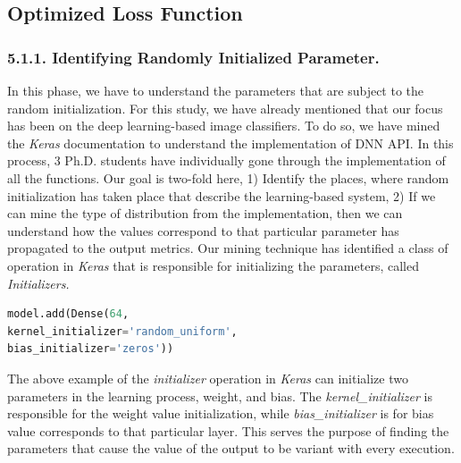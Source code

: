 \subsection{Optimized Loss Function}
\subsubsection{5.1.1. Identifying Randomly Initialized Parameter.}
In this phase, we have to understand the parameters that are subject to the random initialization. For this study, we have already mentioned that our focus has been on the deep learning-based image classifiers. To do so, we have mined the \emph{Keras} documentation to understand the implementation of DNN API. In this process, 3 Ph.D. students have individually gone through the implementation of all the functions. Our goal is two-fold here, 1) Identify the places, where random initialization has taken place that describe the learning-based system, 2) If we can mine the type of distribution from the implementation, then we can understand how the values correspond to that particular parameter has propagated to the output metrics. Our mining technique has identified a class of operation in \emph{Keras} that is responsible for initializing the parameters, called \emph{Initializers.} 
\begin{lstlisting}[language=Python, caption=Example of initialization parameters in Keras]
model.add(Dense(64,
kernel_initializer='random_uniform',
bias_initializer='zeros'))
\end{lstlisting}
The above example of the \emph{initializer} operation in \emph{Keras} can initialize two parameters in the learning process, weight, and bias. The \emph{kernel\_initializer} is responsible for the weight value initialization, while \emph{bias\_initializer} is for bias value corresponds to that particular layer. This serves the purpose of finding the parameters that cause the value of the output to be variant with every execution. 

